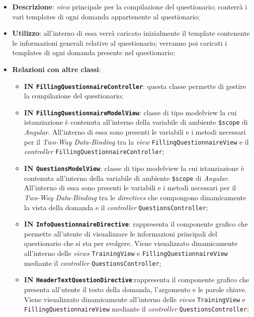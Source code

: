\begin{itemize}
	\item \textbf{Descrizione}: \textit{view} principale per la compilazione del questionario; conterrà i vari templates di ogni domanda appartenente al questionario;
	\item \textbf{Utilizzo}: all'interno di essa verrà caricato inizialmente il template contenente le informazioni generali relative al questionario; verranno poi caricati i templates di ogni domanda presente nel questionario;
	\item \textbf{Relazioni con altre classi}: 
	\begin{itemize}
		\item \textbf{IN \texttt{FillingQuestionnaireController}}: questa classe permette di gestire la compilazione del questionario;
		\item \textbf{IN \texttt{FillingQuestionnaireModelView}}: classe di tipo modelview la cui istanziazione è contenuta all'interno della variabile di ambiente \texttt{\$scope} di \textit{Angular}. All'interno di essa sono presenti le variabili e i metodi necessari per il \textit{Two-Way Data-Binding} tra la \textit{view} \texttt{FillingQuestionnaireView} e il \textit{controller} \texttt{FillingQuestionnaireController};
		\item \textbf{IN \texttt{QuestionsModelView}}: classe di tipo modelview la cui istanziazione è contenuta all'interno della variabile di ambiente \texttt{\$scope} di \textit{Angular}. All'interno di essa sono presenti le variabili e i metodi necessari per il \textit{Two-Way Data-Binding} tra le \textit{directives} che compongono dinamicamente la vista della domanda e il \textit{controller} \texttt{QuestionsController};
		\item \textbf{IN \texttt{InfoQuestionnaireDirective}}: rappresenta il componente grafico che permette all'utente di visualizzare le informazioni principali del questionario che si sta per svolgere. Viene visualizzato dinamicamente all'interno delle \textit{views} \texttt{TrainingView} e \texttt{FillingQuestionnaireView} mediante il \textit{controller} \texttt{QuestionsController};
		\item \textbf{IN \texttt{HeaderTextQuestionDirective}}:rappresenta il componente grafico che presenta all'utente il testo della domanda, l'argomento e le parole chiave. Viene visualizzato dinamicamente all'interno delle \textit{views} \texttt{TrainingView} e \texttt{FillingQuestionnaireView} mediante il \textit{controller} \texttt{QuestionsController};

\end{itemize}
\end{itemize}
